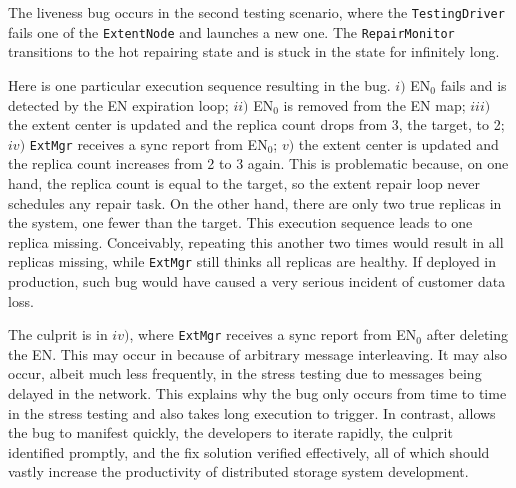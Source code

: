 The liveness bug occurs in the second testing scenario, where the \texttt{TestingDriver} fails one of the \texttt{ExtentNode} and launches a new one. The \texttt{RepairMonitor} transitions to the hot repairing state and is stuck in the state for infinitely long.

Here is one particular execution sequence resulting in the bug. $i)$ EN$_0$ fails and is detected by the EN expiration loop; $ii)$ EN$_0$ is removed from the EN map; $iii)$ the extent center is updated and the replica count drops from 3, the target, to 2; $iv)$ \texttt{ExtMgr} receives a sync report from EN$_0$; $v)$ the extent center is updated and the replica count increases from 2 to 3 again. This is problematic because, on one hand, the replica count is equal to the target, so the extent repair loop never schedules any repair task. On the other hand, there are only two true replicas in the system, one fewer than the target. This execution sequence leads to one replica missing. Conceivably, repeating this another two times would result in all replicas missing, while \texttt{ExtMgr} still thinks all replicas are healthy. If deployed in production, such bug would have caused a very serious incident of customer data loss.

The culprit is in $iv)$, where \texttt{ExtMgr} receives a sync report from EN$_0$ after deleting the EN. This may occur in \psharp because of arbitrary message interleaving. It may also occur, albeit much less frequently, in the stress testing due to messages being delayed in the network. This explains why the bug only occurs from time to time in the stress testing and also takes long execution to trigger. In contrast, \psharp allows the bug to manifest quickly, the developers to iterate rapidly, the culprit identified promptly, and the fix solution verified effectively, all of which should vastly increase the productivity of distributed storage system development. 

